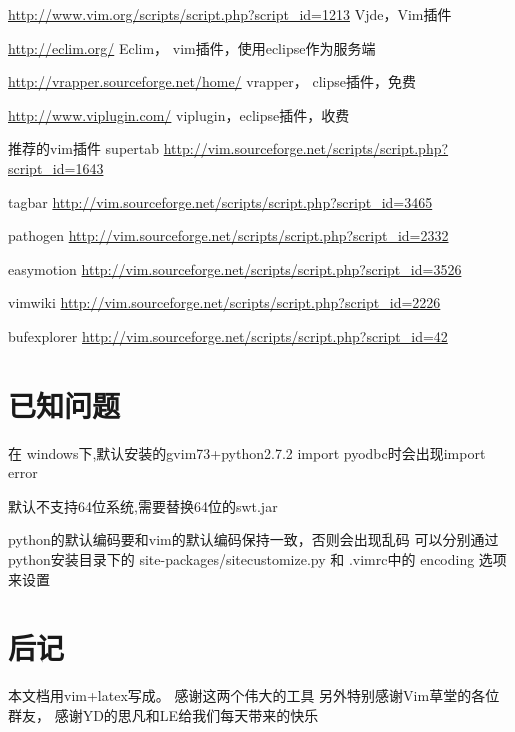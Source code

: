 \documentclass[oneside,openany]{book}
\begin{document}
  \href{http://www.vim.org/scripts/script.php?script\_id=1213}{http://www.vim.org/scripts/script.php?script\_id=1213} 
  Vjde，Vim插件
  \newline

  \href{http://eclim.org/}{http://eclim.org/} Eclim， vim插件，使用eclipse作为服务端
  \newline

  \href{http://vrapper.sourceforge.net/home/}{http://vrapper.sourceforge.net/home/}
  vrapper， clipse插件，免费
  \newline

  \href{http://www.viplugin.com/}{http://www.viplugin.com/}
  viplugin，eclipse插件，收费
  \newline

  推荐的vim插件
  \newline
  supertab
  \href{http://vim.sourceforge.net/scripts/script.php?script\_id=1643}
   {http://vim.sourceforge.net/scripts/script.php?script\_id=1643}

  tagbar
  \href{http://vim.sourceforge.net/scripts/script.php?script\_id=3465}
   {http://vim.sourceforge.net/scripts/script.php?script\_id=3465}

  pathogen
  \href{http://vim.sourceforge.net/scripts/script.php?script\_id=2332}
   {http://vim.sourceforge.net/scripts/script.php?script\_id=2332}

  easymotion
  \href{http://vim.sourceforge.net/scripts/script.php?script\_id=3526}
   {http://vim.sourceforge.net/scripts/script.php?script\_id=3526}

  vimwiki
  \href{http://vim.sourceforge.net/scripts/script.php?script\_id=2226}
   {http://vim.sourceforge.net/scripts/script.php?script\_id=2226}


  bufexplorer
  \href{http://vim.sourceforge.net/scripts/script.php?script\_id=42}
   {http://vim.sourceforge.net/scripts/script.php?script\_id=42}

\chapter{已知问题}
    在 windows下,默认安装的gvim73+python2.7.2 import pyodbc时会出现import error 

    默认不支持64位系统,需要替换64位的swt.jar 

    python的默认编码要和vim的默认编码保持一致，否则会出现乱码 可以分别通过 python安装目录下的
    site-packages/sitecustomize.py 和 .vimrc中的 encoding 选项来设置 

\chapter{后记}
    本文档用vim+latex写成。 感谢这两个伟大的工具
   \newline
   另外特别感谢Vim草堂的各位群友， 感谢YD的思凡和LE给我们每天带来的快乐
   
   
\end{document}
